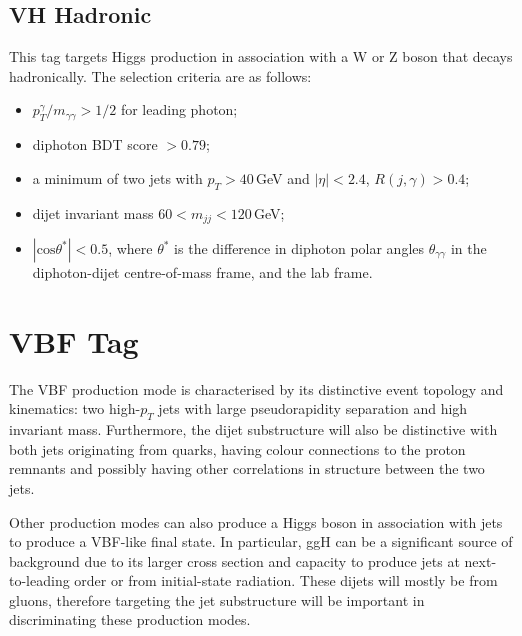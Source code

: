 \subsection{VH Hadronic}
This tag targets Higgs production in association with a W or Z boson that decays hadronically. The selection criteria are as follows:
\begin{itemize}[noitemsep]
    \item $p^{\gamma}_{T}/m_{\gamma\gamma} > 1/2$ for leading photon;
    \item diphoton BDT score $> 0.79$;
    \item a minimum of two jets with $p_T > 40$\,GeV and $|\eta| < 2.4$, $R(j,\gamma) > 0.4$;
    \item dijet invariant mass $60 < m_{jj} < 120$\,GeV;
    \item $|\mathrm{cos}{\theta^{*}}| < 0.5$, where $\theta^{*}$ is the difference in diphoton polar angles $\theta_{\gamma\gamma}$ in the diphoton-dijet centre-of-mass frame, and the lab frame.  
\end{itemize}













\section{VBF Tag}
The VBF production mode is characterised by its distinctive event topology and kinematics: two high-$p_{T}$ jets with large pseudorapidity separation and high invariant mass. Furthermore, the dijet substructure will also be distinctive with both jets originating from quarks, having colour connections to the proton remnants and possibly having other correlations in structure between the two jets. 

Other production modes can also produce a Higgs boson in association with jets to produce a VBF-like final state. 
In particular, ggH can be a significant source of background due to its larger cross section and capacity to produce jets at next-to-leading order or from initial-state radiation. 
These dijets will mostly be from gluons, therefore targeting the jet substructure will be important in discriminating these production modes. 


